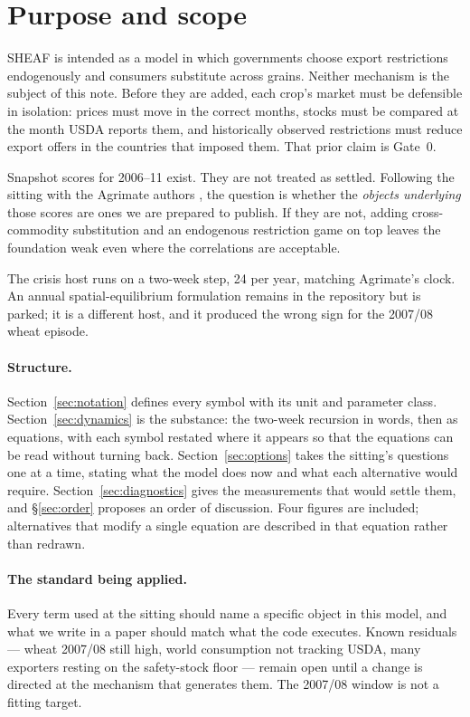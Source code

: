 \section{Purpose and scope}
\label{sec:howto}

SHEAF is intended as a model in which governments choose export
restrictions endogenously and consumers substitute across grains. Neither
mechanism is the subject of this note. Before they are added, each crop's
market must be defensible in isolation: prices must move in the correct
months, stocks must be compared at the month USDA reports them, and
historically observed restrictions must reduce export offers in the
countries that imposed them. That prior claim is Gate~0.

Snapshot scores for 2006--11 exist. They are not treated as settled.
Following the sitting with the Agrimate authors \citep{kuhla2025}, the
question is whether the \emph{objects underlying} those scores are ones we
are prepared to publish. If they are not, adding cross-commodity
substitution and an endogenous restriction game on top leaves the
foundation weak even where the correlations are acceptable.

The crisis host runs on a two-week step, 24 per year, matching Agrimate's
clock. An annual spatial-equilibrium formulation remains in the repository
but is parked; it is a different host, and it produced the wrong sign for
the 2007/08 wheat episode.

\paragraph{Structure.}
Section~\ref{sec:notation} defines every symbol with its unit and
parameter class. Section~\ref{sec:dynamics} is the substance: the two-week
recursion in words, then as equations, with each symbol restated where it
appears so that the equations can be read without turning back.
Section~\ref{sec:options} takes the sitting's questions one at a time,
stating what the model does now and what each alternative would require.
Section~\ref{sec:diagnostics} gives the measurements that would settle
them, and \S\ref{sec:order} proposes an order of discussion. Four figures
are included; alternatives that modify a single equation are described in
that equation rather than redrawn.

\paragraph{The standard being applied.}
Every term used at the sitting should name a specific object in this
model, and what we write in a paper should match what the code executes.
Known residuals --- wheat 2007/08 still high, world consumption not
tracking USDA, many exporters resting on the safety-stock floor --- remain
open until a change is directed at the mechanism that generates them. The
2007/08 window is not a fitting target.
